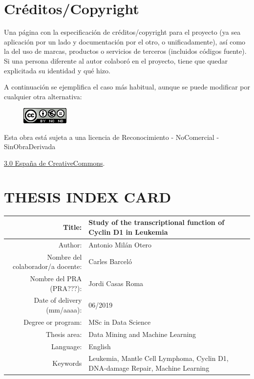 \setcounter{page}{1} 
\pagestyle{plain}

\chapter*{Créditos/Copyright}

Una página con la especificación de créditos/copyright para el proyecto (ya sea aplicación por un lado y documentación por el otro, o unificadamente), así como la del uso de marcas, productos o servicios de terceros (incluidos códigos fuente). Si una persona diferente al autor colaboró en el proyecto, tiene que quedar explicitada su identidad y qué hizo.

A continuación se ejemplifica el caso más habitual, aunque se puede modificar por cualquier otra alternativa:

\vspace{1cm}

\begin{figure}[ht]
    \centering
	\includegraphics[scale=1]{../images/license.png}
\end{figure}

Esta obra está sujeta a una licencia de Reconocimiento -  NoComercial - SinObraDerivada

\href{https://creativecommons.org/licenses/by-nc-nd/3.0/es/}{3.0 España de CreativeCommons}.

\chapter*{THESIS INDEX CARD}

\begin{table}[ht]
	\centering{}
	\renewcommand{\arraystretch}{2}
	\begin{tabular}{r | p{8cm}}
		\hline
		Title: & Study of the transcriptional function \newline of Cyclin D1 in Leukemia\\
		\hline
        Author: & Antonio Milán Otero\\
		\hline
        Nombre del colaborador/a docente: & Carles Barceló\\
		\hline
        Nombre del PRA (PRA???): & Jordi Casas Roma\\
		\hline
        Date of delivery (mm/aaaa): & 06/2019\\
		\hline
        Degree or program: & MSc in Data Science\\
		\hline
        Thesis area: & Data Mining and Machine Learning\\
		\hline
        Language: & English\\
		\hline
        Keywords & Leukemia, Mantle Cell Lymphoma, Cyclin D1, DNA-damage Repair, Machine Learning\\
		\hline
	\end{tabular}
\end{table}

